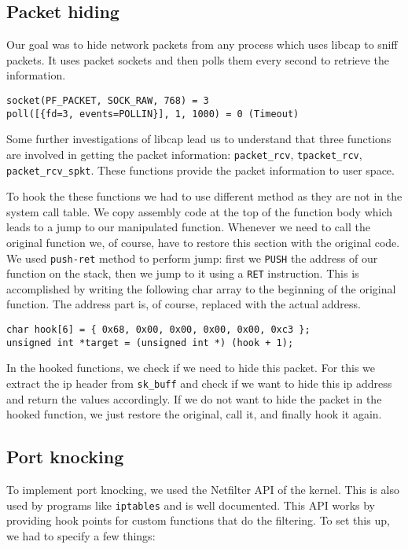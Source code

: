 \documentclass[10pt, letterpaper]{scrartcl}
\begin{document}
\subsection{Packet hiding}
Our goal was to hide network packets from any process which uses libcap to sniff packets.
It uses packet sockets and then polls them every second to retrieve the information.   

\begin{verbatim}
socket(PF_PACKET, SOCK_RAW, 768) = 3
poll([{fd=3, events=POLLIN}], 1, 1000) = 0 (Timeout)
\end{verbatim} 

Some further investigations of libcap lead us to understand that three functions are involved in getting the packet information: \texttt{packet\_rcv}, \texttt{tpacket\_rcv}, \texttt{packet\_rcv\_spkt}. These functions provide the packet information to user space.

To hook the these functions we had to use different method as they are not in the system call table. 
We copy assembly code at the top of the function body which leads to a jump to our manipulated function.
Whenever we need to call the original function we, of course, have to restore this section with the original code.
We used \texttt{push-ret} method to perform jump: first we \texttt{PUSH} the address of our function on the stack, then we jump to it using a \texttt{RET} instruction.
This is accomplished by writing the following char array to the beginning of the original function.
The address part is, of course, replaced with the actual address.

\begin{verbatim}
char hook[6] = { 0x68, 0x00, 0x00, 0x00, 0x00, 0xc3 };
unsigned int *target = (unsigned int *) (hook + 1);
\end{verbatim} 

In the hooked functions, we check if we need to hide this packet.
For this we extract the ip header from \texttt{sk\_buff} and check if we want to hide this ip address and return the values accordingly. 
If we do not want to hide the packet in the hooked function, we just restore the original, call it, and finally hook it again. 
  
\subsection{Port knocking}
To implement port knocking, we used the Netfilter API of the kernel.
This is also used by programs like \texttt{iptables} and is well documented.
This API works by providing hook points for custom functions that do the filtering.
To set this up, we had to specify a few things:
\end{document}
